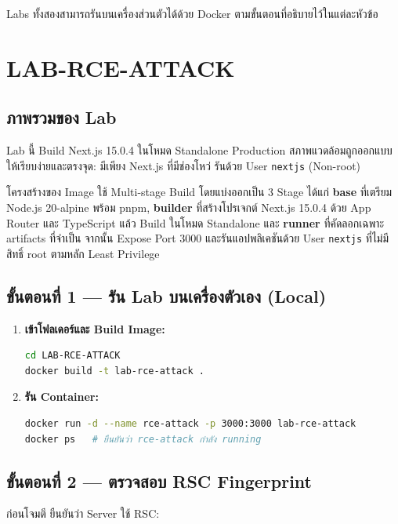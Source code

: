 \documentclass[12pt,oneside]{report}
\begin{document}
Labs ทั้งสองสามารถรันบนเครื่องส่วนตัวได้ด้วย Docker ตามขั้นตอนที่อธิบายไว้ในแต่ละหัวข้อ

\section{LAB-RCE-ATTACK}

\subsection{ภาพรวมของ Lab}

Lab นี้ Build Next.js 15.0.4 ในโหมด Standalone Production สภาพแวดล้อมถูกออกแบบให้เรียบง่ายและตรงจุด: มีเพียง Next.js ที่มีช่องโหว่ รันด้วย User \texttt{nextjs} (Non-root)

โครงสร้างของ Image ใช้ Multi-stage Build โดยแบ่งออกเป็น 3 Stage ได้แก่ \textbf{base} ที่เตรียม Node.js 20-alpine พร้อม pnpm, \textbf{builder} ที่สร้างโปรเจกต์ Next.js 15.0.4 ด้วย App Router และ TypeScript แล้ว Build ในโหมด Standalone และ \textbf{runner} ที่คัดลอกเฉพาะ artifacts ที่จำเป็น จากนั้น Expose Port 3000 และรันแอปพลิเคชันด้วย User \texttt{nextjs} ที่ไม่มีสิทธิ์ root ตามหลัก Least Privilege

\newpage

\subsection{ขั้นตอนที่ 1 — รัน Lab บนเครื่องตัวเอง (Local)}

\begin{enumerate}
    \item \textbf{เข้าโฟลเดอร์และ Build Image:}
    \begin{lstlisting}[language=bash]
cd LAB-RCE-ATTACK
docker build -t lab-rce-attack .
    \end{lstlisting}

    \item \textbf{รัน Container:}
    \begin{lstlisting}[language=bash]
docker run -d --name rce-attack -p 3000:3000 lab-rce-attack
docker ps   # ยืนยันว่า rce-attack กำลัง running
    \end{lstlisting}
\end{enumerate}

\subsection{ขั้นตอนที่ 2 — ตรวจสอบ RSC Fingerprint}

ก่อนโจมตี ยืนยันว่า Server ใช้ RSC:
\end{document}
